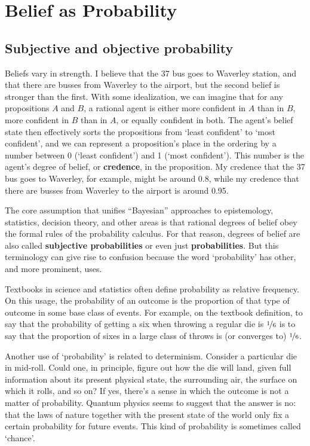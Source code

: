 \chapter{Belief as Probability}\label{ch:probability}


\section{Subjective and objective probability}

Beliefs vary in strength. I believe that the 37 bus goes to Waverley station,
and that there are busses from Waverley to the airport, but the second belief is
stronger than the first. With some idealization, we can imagine that for any
propositions $A$ and $B$, a rational agent is either more confident in $A$ than
in $B$, more confident in $B$ than in $A$, or equally confident in both. The
agent's belief state then effectively sorts the propositions from `least
confident' to `most confident', and we can represent a proposition's place in
the ordering by a number between 0 (`least confident') and 1 (`most confident').
This number is the agent's degree of belief, or \textbf{credence}, in the
proposition. My credence that the 37 bus goes to Waverley, for example, might be
around 0.8, while my credence that there are busses from Waverley to the airport
is around 0.95.

The core assumption that unifies ``Bayesian'' approaches to epistemology,
statistics, decision theory, and other areas is that rational degrees of belief
obey the formal rules of the probability calculus. For that reason, degrees of
belief are also called \textbf{subjective probabilities} or even just
\textbf{probabilities}. But this terminology can give rise to confusion because
the word `probability' has other, and more prominent, uses.

Textbooks in science and statistics often define probability as relative
frequency. On this usage, the probability of an outcome is the proportion of
that type of outcome in some base class of events. For example, on the textbook
definition, to say that the probability of getting a six when throwing a regular
die is $\nicefrac{1}{6}$ is to say that the proportion of sixes in a large class
of throws is (or converges to) $\nicefrac{1}{6}$.

Another use of `probability' is related to determinism. Consider a particular
die in mid-roll. Could one, in principle, figure out how the die will land, given
full information about its present physical state, the surrounding air, the
surface on which it rolls, and so on? If yes, there's a sense in which the
outcome is not a matter of probability. Quantum physics seems to suggest that
the answer is no: that the laws of nature together with the present state of the
world only fix a certain probability for future events. This kind of probability
is sometimes called `chance'.

